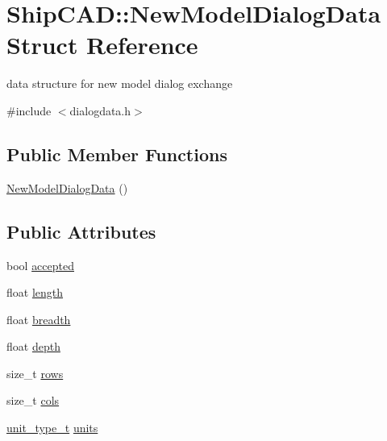 \hypertarget{structShipCAD_1_1NewModelDialogData}{}\section{Ship\+C\+AD\+:\+:New\+Model\+Dialog\+Data Struct Reference}
\label{structShipCAD_1_1NewModelDialogData}


data structure for new model dialog exchange  




{\ttfamily \#include $<$dialogdata.\+h$>$}

\subsection*{Public Member Functions}
\begin{DoxyCompactItemize}
\item 
\hyperlink{structShipCAD_1_1NewModelDialogData_ad7e8e3516c7e2bdd77174785e13e560f}{New\+Model\+Dialog\+Data} ()
\end{DoxyCompactItemize}
\subsection*{Public Attributes}
\begin{DoxyCompactItemize}
\item 
bool \hyperlink{structShipCAD_1_1NewModelDialogData_aff4f1f738dfe7457456bd1e2d0e4f37e}{accepted}
\item 
float \hyperlink{structShipCAD_1_1NewModelDialogData_ad81a20ab469df5a0f65149f967415d31}{length}
\item 
float \hyperlink{structShipCAD_1_1NewModelDialogData_af2d41edf92aa7fa317cc956801aeab50}{breadth}
\item 
float \hyperlink{structShipCAD_1_1NewModelDialogData_a6941e9fd4fd42257c0b05c6076aadc2a}{depth}
\item 
size\+\_\+t \hyperlink{structShipCAD_1_1NewModelDialogData_aa1624f2018fd39dbbe80bc10e70efa8b}{rows}
\item 
size\+\_\+t \hyperlink{structShipCAD_1_1NewModelDialogData_ad0fc3e908a10e878c747fac2fe71b67b}{cols}
\item 
\hyperlink{namespaceShipCAD_ac6a7a28b4b063771afae92decb602da5}{unit\+\_\+type\+\_\+t} \hyperlink{structShipCAD_1_1NewModelDialogData_a8ff4b02ff5c3ce20c0b0d3bdade551a7}{units}
\end{DoxyCompactItemize}


